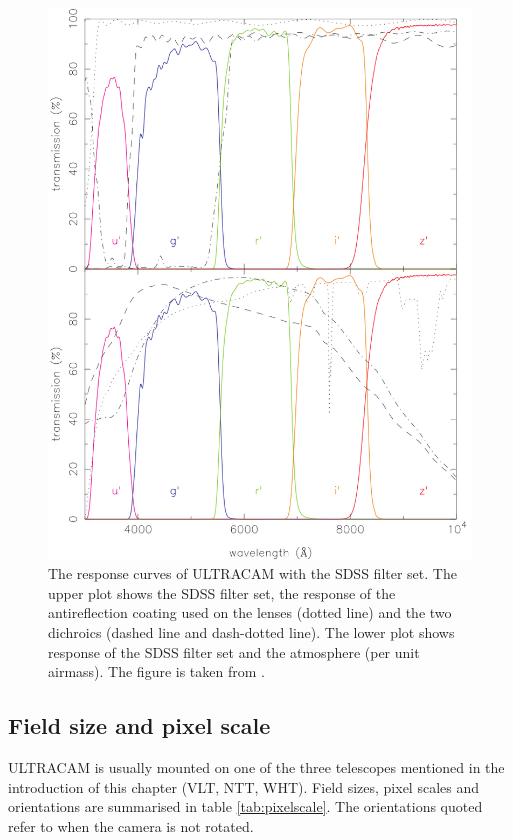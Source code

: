 \begin{figure}
\centering
\includegraphics[width=130mm]{images/ucamresponsecurves.png}
\caption{The response curves of ULTRACAM with the SDSS filter set. The upper plot shows the SDSS filter set, the response of the antireflection coating used on the lenses (dotted line) and the two dichroics (dashed line and dash-dotted line). The lower plot shows response of the SDSS filter set and the atmosphere (per unit airmass). The figure is taken from \citet{dhillon07}.}
\label{fig:responsecurves}
\end{figure}


\subsection{Field size and pixel scale}
ULTRACAM is usually mounted on one of the three telescopes mentioned in the introduction of this chapter (VLT, NTT, WHT). Field sizes, pixel scales and orientations are summarised in table \ref{tab:pixelscale}. The orientations quoted refer to when the camera is not rotated. 

